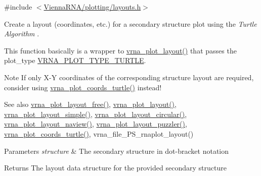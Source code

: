 {\ttfamily \#include $<$\mbox{\hyperlink{layouts_8h}{Vienna\+R\+N\+A/plotting/layouts.\+h}}$>$}



Create a layout (coordinates, etc.) for a secondary structure plot using the {\itshape Turtle Algorithm} \cite{wiegreffe:2018}. 

This function basically is a wrapper to \mbox{\hyperlink{group__plot__layout__utils_ga7953b759eada86c61b0a4aebe0dc67d1}{vrna\+\_\+plot\+\_\+layout()}} that passes the {\ttfamily plot\+\_\+type} \mbox{\hyperlink{group__plot__layout__utils_ga382c1c5c0b1943500aa4bb55b7658a33}{V\+R\+N\+A\+\_\+\+P\+L\+O\+T\+\_\+\+T\+Y\+P\+E\+\_\+\+T\+U\+R\+T\+LE}}.

\begin{DoxyNote}{Note}
If only X-\/Y coordinates of the corresponding structure layout are required, consider using \mbox{\hyperlink{group__plot__layout__utils_ga195139110e2877b92c7f82d05b6dad19}{vrna\+\_\+plot\+\_\+coords\+\_\+turtle()}} instead!
\end{DoxyNote}
\begin{DoxySeeAlso}{See also}
\mbox{\hyperlink{group__plot__layout__utils_ga996128730020a2d7a7368b4248195931}{vrna\+\_\+plot\+\_\+layout\+\_\+free()}}, \mbox{\hyperlink{group__plot__layout__utils_ga7953b759eada86c61b0a4aebe0dc67d1}{vrna\+\_\+plot\+\_\+layout()}}, \mbox{\hyperlink{group__plot__layout__utils_ga8b09019a429c7c2447be94901c7ed658}{vrna\+\_\+plot\+\_\+layout\+\_\+simple()}}, \mbox{\hyperlink{group__plot__layout__utils_ga41d94adbd42e1a570d840756e6dd6909}{vrna\+\_\+plot\+\_\+layout\+\_\+circular()}}, \mbox{\hyperlink{group__plot__layout__utils_gab0e886afe200db9323e4e65d44738177}{vrna\+\_\+plot\+\_\+layout\+\_\+naview()}}, \mbox{\hyperlink{group__plot__layout__utils_ga57f815d56c8c083c016381213f581f1e}{vrna\+\_\+plot\+\_\+layout\+\_\+puzzler()}}, \mbox{\hyperlink{group__plot__layout__utils_ga195139110e2877b92c7f82d05b6dad19}{vrna\+\_\+plot\+\_\+coords\+\_\+turtle()}}, vrna\+\_\+file\+\_\+\+P\+S\+\_\+rnaplot\+\_\+layout()
\end{DoxySeeAlso}

\begin{DoxyParams}{Parameters}
{\em structure} & The secondary structure in dot-\/bracket notation \\
\hline
\end{DoxyParams}
\begin{DoxyReturn}{Returns}
The layout data structure for the provided secondary structure 
\end{DoxyReturn}
\mbox{\label{group__plot__layout__utils_ga57f815d56c8c083c016381213f581f1e}} 
